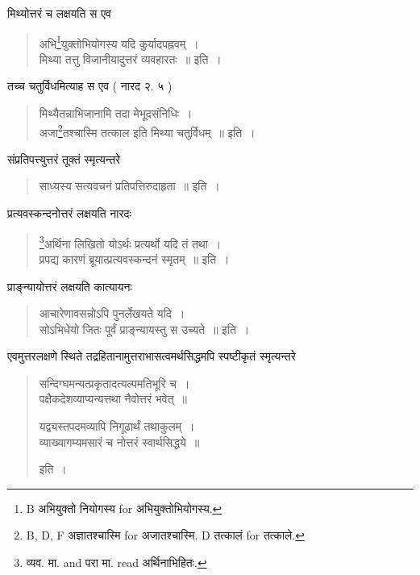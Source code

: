 \documentclass[11pt, openany]{book}
\begin{document}
मिथ्योत्तरं च लक्षयति स एव

\begin{quote}
{\vy अभि\renewcommand{\thefootnote}{1}\footnote{B अभियुक्तो नियोगस्य for अभियुक्तोभियोगस्य.}युक्तोभियोगस्य यदि कुर्यादपह्नवम्~।\\
मिथ्या तत्तु विजानीयादुत्तरं व्यवहारतः~॥} इति~।
\end{quote}

तच्च चतुर्विधमित्याह स एव ( नारद २. ५ ) 

\begin{quote}
{\vy मिथ्यैतन्नाभिजानामि तदा मेभूदसंनिधिः~।\\
अजा\renewcommand{\thefootnote}{2}\footnote{B, D, F अज्ञातश्चास्मि for अजातश्चास्मि. D तत्कालं for तत्काले.}तश्चास्मि तत्काल इति मिथ्या चतुर्विधम्~॥} इति~।
\end{quote}

संप्रतिपत्त्युत्तरं तूक्तं स्मृत्यन्तरे 

\begin{quote}
{\vy साध्यस्य सत्यवचनं प्रतिपत्तिरुदाहृता~॥} इति~।
\end{quote}

प्रत्यवस्कन्दनोत्तरं लक्षयति नारदः 

\begin{quote}
{\vy \renewcommand{\thefootnote}{3}\footnote{व्यव. मा. and परा मा. read अर्थिनाभिहितः.}अर्थिना लिखितो योऽर्थः प्रत्यर्थो यदि तं तथा~।\\
प्रपद्य कारणं ब्रूयात्प्रत्यवस्कन्दनं स्मृतम्~॥} इति~।
\end{quote}

प्राङ्न्यायोत्तरं लक्षयति कात्यायनः 

\begin{quote}
{\vy आचारेणावसन्नोऽपि पुनर्लेखयते यदि~।\\
सोऽभिधेयो जितः पूर्वं प्राङ्न्यायस्तु स उच्यते~॥} इति~।
\end{quote}

एवमुत्तरलक्षणे स्थिते तद्रहितानामुत्तराभासत्वमर्थसिद्धमपि स्पष्टीकृतं स्मृत्यन्तरे

\begin{quote}
{\vy सन्दिग्घमन्यत्प्रकृतादत्यल्पमतिभूरि च~।\\
पक्षैकदेशव्याप्यन्यत्तथा नैवोत्तरं भवेत्~॥

यद्व्यस्तपदमव्यापि निगूढार्थं तथाकुलम्~।\\
व्याख्यागम्यमसारं च नोत्तरं स्वार्थसिद्धये~॥} इति~।
\end{quote}

\newpage
{}
\end{document}
